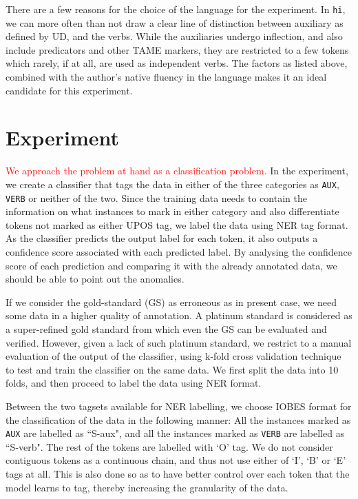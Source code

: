 There are a few reasons for the choice of the language for the experiment. In \verb|hi|, we can more often than not draw a clear line of distinction between auxiliary as defined by UD, and the verbs. While the auxiliaries undergo inflection, and also include predicators and other TAME markers, they are restricted to a few tokens which rarely, if at all, are used as independent verbs. The factors as listed above, combined with the author's native fluency in the language makes it an ideal candidate for this experiment.

\section{Experiment}
\label{ssec:auxverbExperiment}

\textcolor{red}{We approach the problem at hand as a classification problem.} In the experiment, we create a classifier that tags the data in either of the three categories as \verb|AUX|, \verb|VERB| or neither of the two. Since the training data needs to contain the information on what instances to mark in either category and also differentiate tokens not marked as either UPOS tag, we label the data using NER tag format. As the classifier predicts the output label for each token, it also outputs a confidence score associated with each predicted label. By analysing the confidence score of each prediction and comparing it with the already annotated data, we should be able to point out the anomalies.

If we consider the gold-standard (GS) as erroneous as in present case, we need some data in a higher quality of annotation. A platinum standard is considered as a super-refined gold standard from which even the GS can be evaluated and verified. However, given a lack of such platinum standard, we restrict to a manual evaluation of the output of the classifier, using k-fold cross validation technique to test and train the classifier on the same data. We first split the data into 10 folds, and then proceed to label the data using NER format.

Between the two tagsets available for NER labelling, we choose IOBES format for the classification of the data in the following manner: All the instances marked as \texttt{AUX} are labelled as ``S-aux", and all the instances marked as \texttt{VERB} are labelled as ``S-verb". The rest of the tokens are labelled with `O' tag. We do not consider contiguous tokens as a continuous chain, and thus not use either of `I', `B' or `E' tags at all. This is also done so as to have better control over each token that the model learns to tag, thereby increasing the granularity of the data.

